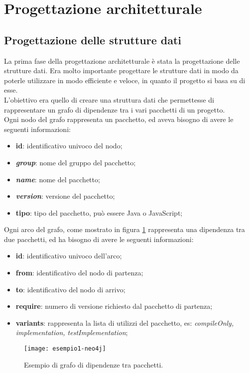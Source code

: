 
\section{Progettazione architetturale}
\subsection*{Progettazione delle strutture dati}
La prima fase della progettazione architetturale è stata la progettazione delle strutture dati. 
Era molto importante progettare le strutture dati in modo da poterle utilizzare in modo efficiente e 
veloce, in quanto il progetto si basa su di esse.\\
L'obiettivo era quello di creare una struttura dati che permettesse di rappresentare un grafo di dipendenze tra i vari pacchetti di un progetto.\\
Ogni nodo del grafo rappresenta un pacchetto, ed aveva bisogno di avere le seguenti informazioni:
\begin{itemize}
  \item \textbf{id}: identificativo univoco del nodo;
  \item \textbf{\textit{group}}: nome del gruppo del pacchetto;
  \item \textbf{\textit{name}}: nome del pacchetto;
  \item \textbf{\textit{version}}: versione del pacchetto;
  \item \textbf{tipo}: tipo del pacchetto, può essere Java o JavaScript;
\end{itemize}

\noindent Ogni arco del grafo, come mostrato in figura \ref*{fig:esempio1-neo4j} rappresenta una dipendenza tra due pacchetti, 
ed ha bisogno di avere le seguenti informazioni:
\begin{itemize}
  \item \textbf{id}: identificativo univoco dell'arco;
  \item \textbf{from}: identificativo del nodo di partenza;
  \item \textbf{to}: identificativo del nodo di arrivo;
  \item \textbf{require}: numero di versione richiesto dal pacchetto di partenza;
  \item \textbf{variants}: rappresenta la lista di utilizzi del pacchetto, es: \textit{compileOnly, implementation, testImplementation}; 
\end{itemize}

\begin{figure}[!h] 
  \centering 
  \texttt{[image: esempio1-neo4j]} 
  \caption{Esempio di grafo di dipendenze tra pacchetti.}
  \label{fig:esempio1-neo4j}
\end{figure}

